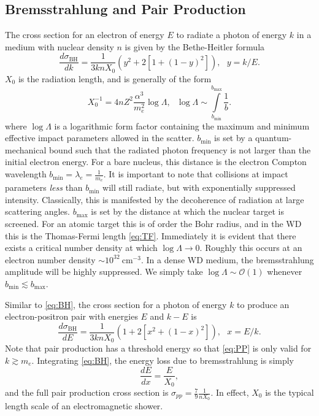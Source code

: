 \documentclass[twocolumn,showpacs,preprintnumbers,amsmath,amssymb,prd]{revtex4}
\newcommand{\OO}{\mathcal{O}}
\begin{document}
\begin{appendices}
\subsection*{Bremsstrahlung and Pair Production}
The cross section for an electron of energy $E$ to radiate a photon of energy $k$ in a medium with nuclear density $n$ is given by the Bethe-Heitler formula
\begin{equation}
\label{eq:BH}
\frac{d \sigma_\text{BH}}{dk} = \frac{1}{3 k n X_0} (y^2+2 [1+ (1-y)^2]), ~~~ y = k/E.
\end{equation}
$X_0$ is the radiation length, and is generally of the form
\begin{equation}
X_0^{-1} = 4 n Z^2 \frac{\alpha^3}{m_e^2} \log{\Lambda}, ~~~ \log{\Lambda} \sim \int \limits_{b_\text{min}}^{b_\text{max}} \frac{1}{b}.
\end{equation}
where $\log{\Lambda}$ is a logarithmic form factor containing the maximum and minimum effective impact parameters allowed in the scatter. $b_\text{min}$ is set by a quantum-mechanical bound such that the radiated photon frequency is not larger than the initial electron energy. For a bare nucleus, this distance is the electron Compton wavelength $b_\text{min} = \lambda_e = \frac{1}{m_e}$. It is important to note that collisions at impact parameters \emph{less} than $b_\text{min}$ will still radiate, but with exponentially suppressed intensity. Classically, this is manifested by the decoherence of radiation at large scattering angles. $b_\text{max}$ is set by the distance at which the nuclear target is screened. For an atomic target this is of order the Bohr radius, and in the WD this is the Thomas-Fermi length \eqref{eq:TF}. Immediately it is evident that there exists a critical number density at which $\log \Lambda \to 0$. Roughly this occurs at an electron number density $\sim 10^{32} ~\text{cm}^{-3}$. In a dense WD medium, the bremsstrahlung amplitude will be highly suppressed. We simply take $\log{\Lambda} \sim \OO(1)$ whenever $b_\text{min} \lesssim b_\text{max}$.

Similar to \eqref{eq:BH}, the cross section for a photon of energy $k$ to produce an electron-positron pair with energies $E$ and $k-E$ is
\begin{equation}
\label{eq:PP}
\frac{d \sigma_\text{BH}}{dE} = \frac{1}{3 k n X_0} (1+ 2[x^2+ (1-x)^2]), ~~~ x = E/k.
\end{equation}
Note that pair production has a threshold energy so that \eqref{eq:PP} is only valid for $k \gtrsim m_e$. Integrating \eqref{eq:BH}, the energy loss due to bremsstrahlung is simply
\begin{equation}
\frac{dE}{dx} = \frac{E}{X_0},
\end{equation}
and the full pair production cross section is $\sigma_{pp} = \frac{7}{9} \frac{1}{n X_0}$. In effect, $X_0$ is the typical length scale of an electromagnetic shower.


\end{appendices}
\end{document}
